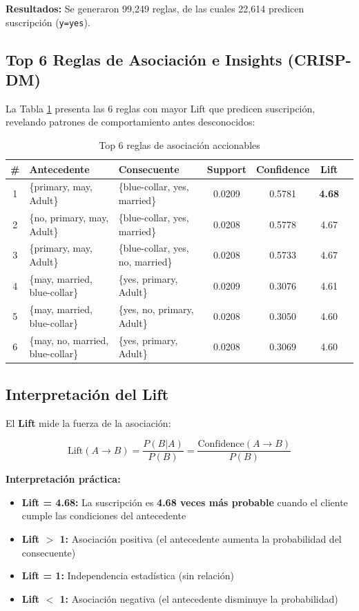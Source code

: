 \documentclass[12pt,letterpaper]{article}
\begin{document}
\textbf{Resultados:} Se generaron 99,249 reglas, de las cuales 22,614 predicen suscripción (\texttt{y=yes}).

\subsection{Top 6 Reglas de Asociación e Insights (CRISP-DM)}

La Tabla \ref{tab:apriori_rules} presenta las 6 reglas con mayor Lift que predicen suscripción, revelando patrones de comportamiento antes desconocidos:

\begin{table}[H]
\centering
\caption{Top 6 reglas de asociación accionables}
\label{tab:apriori_rules}
\small
\begin{tabular}{@{}clp{4cm}cccc@{}}
\toprule
\textbf{\#} & \textbf{Antecedente} & \textbf{Consecuente} & \textbf{Support} & \textbf{Confidence} & \textbf{Lift} \\
\midrule
1 & \{primary, may, Adult\} & \{blue-collar, yes, married\} & 0.0209 & 0.5781 & \textbf{4.68} \\
2 & \{no, primary, may, Adult\} & \{blue-collar, yes, married\} & 0.0208 & 0.5778 & 4.67 \\
3 & \{primary, may, Adult\} & \{blue-collar, yes, no, married\} & 0.0208 & 0.5733 & 4.67 \\
4 & \{may, married, blue-collar\} & \{yes, primary, Adult\} & 0.0209 & 0.3076 & 4.61 \\
5 & \{may, married, blue-collar\} & \{yes, no, primary, Adult\} & 0.0208 & 0.3050 & 4.60 \\
6 & \{may, no, married, blue-collar\} & \{yes, primary, Adult\} & 0.0208 & 0.3069 & 4.60 \\
\bottomrule
\end{tabular}
\end{table}

\subsection{Interpretación del Lift}

El \textbf{Lift} mide la fuerza de la asociación:

\begin{equation}
\text{Lift}(A \rightarrow B) = \frac{P(B|A)}{P(B)} = \frac{\text{Confidence}(A \rightarrow B)}{P(B)}
\end{equation}

\textbf{Interpretación práctica:}
\begin{itemize}
    \item \textbf{Lift = 4.68:} La suscripción es \textbf{4.68 veces más probable} cuando el cliente cumple las condiciones del antecedente
    \item \textbf{Lift $>$ 1:} Asociación positiva (el antecedente aumenta la probabilidad del consecuente)
    \item \textbf{Lift = 1:} Independencia estadística (sin relación)
    \item \textbf{Lift $<$ 1:} Asociación negativa (el antecedente disminuye la probabilidad)
\end{itemize}
\end{document}
